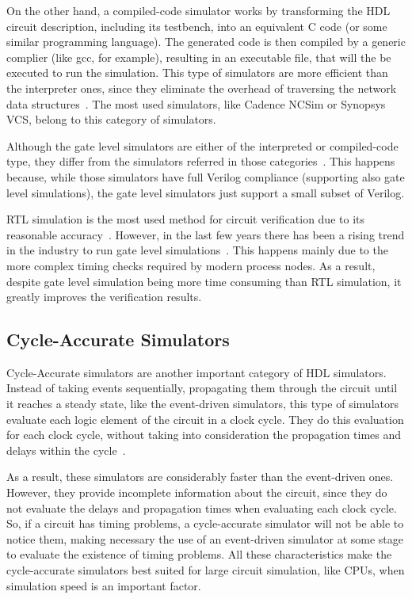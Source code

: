 \documentclass[conference]{IEEEtran}
\begin{document}
On the other hand, a compiled-code simulator works by transforming the \ac{HDL}
circuit description, including its testbench, into an equivalent C code (or some
similar programming language). The generated code is then compiled by a generic
complier (like gcc, for example), resulting in an executable file, that will the
be executed to run the simulation. This type of simulators are more efficient
than the interpreter ones, since they eliminate the overhead of traversing the
network data structures~\cite{lewis:compiled}. The most used simulators, like
Cadence NCSim or Synopsys VCS, belong to this category of simulators.

Although the gate level simulators are either of the interpreted or
compiled-code type, they differ from the simulators referred in those
categories~\cite{tan:vhstas}. This happens because, while those simulators have
full Verilog compliance (supporting also gate level simulations), the gate level
simulators just support a small subset of Verilog.

\ac{RTL} simulation is the most used method for circuit verification due to its
reasonable accuracy~\cite{sousa:reconfigurable}. However, in the last few years
there has been a rising trend in the industry to run gate level
simulations~\cite{khandelwal:gatelevel}. This happens mainly due to the more
complex timing checks required by modern process nodes. As a result, despite
gate level simulation being more time consuming than \ac{RTL} simulation, it greatly
improves the verification results.

\subsection{Cycle-Accurate Simulators}
\label{section:cycle}

Cycle-Accurate simulators are another important category of HDL
simulators. Instead of taking events sequentially, propagating them through the
circuit until it reaches a steady state, like the event-driven simulators, this
type of simulators evaluate each logic element of the circuit in a clock
cycle. They do this evaluation for each clock cycle, without taking into
consideration the propagation times and delays within the
cycle~\cite{khandelwal:gatelevel}.

As a result, these simulators are considerably faster than the event-driven
ones. However, they provide incomplete information about the circuit, since they
do not evaluate the delays and propagation times when evaluating each clock
cycle. So, if a circuit has timing problems, a cycle-accurate simulator will not
be able to notice them, making necessary the use of an event-driven simulator at
some stage to evaluate the existence of timing problems. All these
characteristics make the cycle-accurate simulators best suited for large circuit
simulation, like CPUs, when simulation speed is an important factor.
\end{document}

